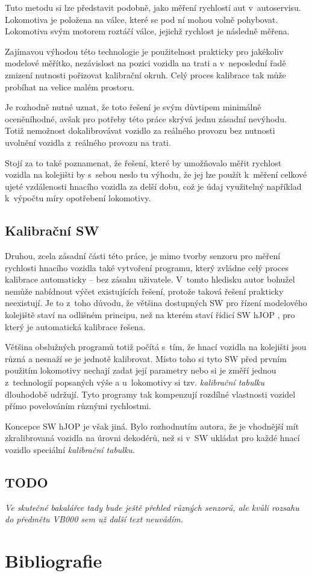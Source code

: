 \documentclass[12pt,a4paper]{article}
\begin{document}
Tuto metodu si lze představit podobně, jako měření rychlostí aut v~autoservisu.
Lokomotiva je položena na válce, které se pod ní mohou volně pohybovat.
Lokomotiva svým motorem roztáčí válce, jejichž rychlost je následně měřena.

Zajímavou výhodou této technologie je použitelnost prakticky pro jakékoliv
modelové měřítko, nezávislost na pozici vozidla na trati a v~neposlední řadě
zmizení nutnosti pořizovat kalibrační okruh. Celý proces kalibrace tak může
probíhat na velice malém prostoru.

Je rozhodně nutné uznat, že toto řešení je svým důvtipem minimálně oceněníhodné,
avšak pro potřeby této práce skrývá jednu zásadní nevýhodu. Totiž nemožnost
dokalibrovávat vozidlo za reálného provozu bez nutnosti uvolnění vozidla
z~reálného provozu na trati.

Stojí za to také poznamenat, že řešení, které by umožňovalo měřit rychlost
vozidla na kolejišti by s~sebou neslo tu výhodu, že jej lze použít k~měření
celkové ujeté vzdálenosti hnacího vozidla za delší dobu, což je údaj využitelný
například k~výpočtu míry opotřebení lokomotivy.

\subsection{Kalibrační SW}

Druhou, zcela zásadní části této práce, je mimo tvorby senzoru pro měření
rychlosti hnacího vozidla také vytvoření programu, který zvládne celý proces
kalibrace automaticky -- bez zásahu uživatele. V~tomto hledisku autor bohužel
nemůže nabídnout výčet existujících řešení, protože taková řešení
prakticky neexistují. Je to z~toho důvodu, že většina dostupných SW pro řízení
modelového kolejiště staví na odlišném principu, než na kterém staví řídicí SW
hJOP \cite{hjop:web}, pro který je automatická kalibrace řešena.

Většina obslužných programů totiž počítá s~tím, že hnací vozidla na kolejišti
jsou různá a nesnaží se je jednotě kalibrovat. Místo toho si tyto SW před
prvním použitím lokomotivy nechají zadat její parametry nebo si je změří jednou
z~technologií popsaných výše a u~lokomotivy si tzv. \textit{kalibrační tabulku}
dlouhodobě udržují. Tyto programy tak kompenzují rozdílné vlastnosti vozidel přímo
povelováním různými rychlostmi.

Koncepce SW hJOP je však jiná. Bylo rozhodnutím autora, že je vhodnější mít
zkralibrovaná vozidla na úrovni dekodérů, než si v~SW ukládat pro každé hnací
vozidlo speciální \textit{kalibrační tabulku}.

\subsection{TODO}

\textit{Ve skutečné bakalářce tady bude ještě přehled různých senzorů, ale
kvůli rozsahu do předmětu VB000 sem už další text neuvádím.}

\section*{Bibliografie}
\printbibliography[heading=none]
\end{document}

